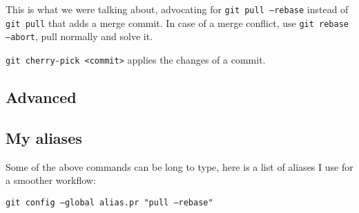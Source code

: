 This is what we were talking about, advocating for \texttt{git pull --rebase} instead of \texttt{git pull} that adds a merge commit. In case of a merge conflict, use \texttt{git rebase --abort}, pull normally and solve it.

\texttt{git cherry-pick <commit>} applies the changes of a commit.


\subsection*{Advanced}

\subsection*{My aliases}

Some of the above commands can be long to type, here is a list of aliases I use for a smoother workflow:

\texttt{git config --global alias.pr "pull --rebase"}
